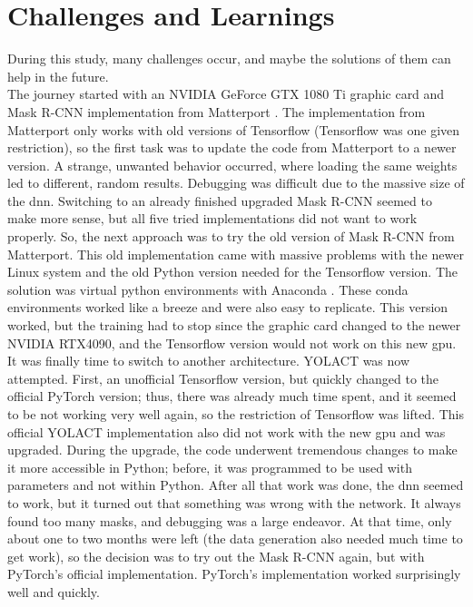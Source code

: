 	\section{Challenges and Learnings}    %
	\label{sec:challenges}
		During this study, many challenges occur, and maybe the solutions of them can help in the future.\\
		The journey started with an NVIDIA GeForce GTX 1080 Ti graphic card and Mask R-CNN implementation from Matterport \cite{Matterport}. The implementation from Matterport only works with old versions of Tensorflow (Tensorflow was one given restriction), so the first task was to update the code from Matterport to a newer version. A strange, unwanted behavior occurred, where loading the same weights led to different, random results. Debugging was difficult due to the massive size of the \acl{dnn}. 
		\clearpage
		Switching to an already finished upgraded Mask R-CNN seemed to make more sense, but all five tried implementations did not want to work properly. So, the next approach was to try the old version of Mask R-CNN from Matterport. This old implementation came with massive problems with the newer Linux system and the old Python version needed for the Tensorflow version. The solution was virtual python environments with Anaconda \cite{anaconda}. These conda environments worked like a breeze and were also easy to replicate. This version worked, but the training had to stop since the graphic card changed to the newer NVIDIA RTX4090, and the Tensorflow version would not work on this new \ac{gpu}. It was finally time to switch to another architecture. YOLACT \cite{Bolya2019} was now attempted. First, an unofficial Tensorflow version, but quickly changed to the official PyTorch version; thus, there was already much time spent, and it seemed to be not working very well again, so the restriction of Tensorflow was lifted. This official YOLACT implementation also did not work with the new \ac{gpu} and was upgraded. During the upgrade, the code underwent tremendous changes to make it more accessible in Python; before, it was programmed to be used with parameters and not within Python. After all that work was done, the \ac{dnn} seemed to work, but it turned out that something was wrong with the network. It always found too many masks, and debugging was a large endeavor. At that time, only about one to two months were left (the data generation also needed much time to get work), so the decision was to try out the Mask R-CNN again, but with PyTorch's official implementation. PyTorch's implementation worked surprisingly well and quickly. \\
